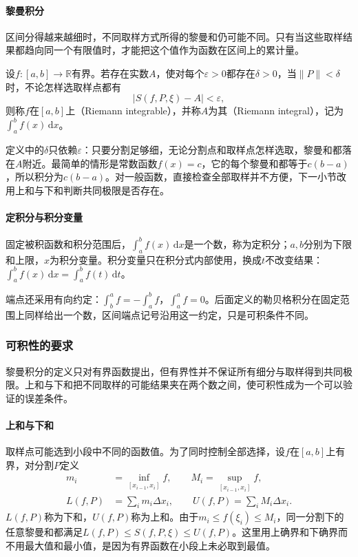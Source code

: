 \paragraph{黎曼积分}
区间分得越来越细时，不同取样方式所得的黎曼和仍可能不同。只有当这些取样结果都趋向同一个有限值时，才能把这个值作为函数在区间上的累计量。

\begin{definition}[黎曼积分]
\label{def:analysis-riemann-integral}
设$f:[a,b]\to\mathbb R$有界。若存在实数$A$，使对每个$\varepsilon>0$都存在$\delta>0$，当$\lVert P\rVert<\delta$时，不论怎样选取样点都有
\[
 |S(f,P,\xi)-A|<\varepsilon,
\]
则称$f$在$[a,b]$上（Riemann integrable），并称$A$为其（Riemann integral），记为$\int_a^bf(x)\,\mathrm dx$。
\end{definition}
定义中的$\delta$只依赖$\varepsilon$：只要分割足够细，无论分割点和取样点怎样选取，黎曼和都落在$A$附近。最简单的情形是常数函数$f(x)=c$，它的每个黎曼和都等于$c(b-a)$，所以积分为$c(b-a)$。对一般函数，直接检查全部取样并不方便，下一小节改用上和与下和判断共同极限是否存在。

\paragraph{定积分与积分变量}
固定被积函数和积分范围后，$\int_a^bf(x)\,\mathrm dx$是一个数，称为定积分；$a,b$分别为下限和上限，$x$为积分变量。积分变量只在积分式内部使用，换成$t$不改变结果：$\int_a^bf(x)\,\mathrm dx=\int_a^bf(t)\,\mathrm dt$。

端点还采用有向约定：$\int_b^af=-\int_a^bf$，$\int_a^af=0$。后面定义的勒贝格积分在固定范围上同样给出一个数，区间端点记号沿用这一约定，只是可积条件不同。

\subsubsection{可积性的要求}
\label{sec:analysis-integrability-requirements}

黎曼积分的定义只对有界函数提出，但有界性并不保证所有细分与取样得到共同极限。上和与下和把不同取样的可能结果夹在两个数之间，使可积性成为一个可以验证的误差条件。

\paragraph{上和与下和}
取样点可能选到小段中不同的函数值。为了同时控制全部选择，设$f$在$[a,b]$上有界，对分割$P$定义
\begin{equation}
 \begin{aligned}
 m_i&=\inf_{[x_{i-1},x_i]}f,\qquad M_i=\sup_{[x_{i-1},x_i]}f,\\
 L(f,P)&=\sum_i m_i\Delta x_i,\qquad
 U(f,P)=\sum_i M_i\Delta x_i.
 \end{aligned}
\label{eq:analysis-riemann-upper-lower-sums}
\end{equation}
$L(f,P)$称为下和，$U(f,P)$称为上和。由于$m_i\leq f(\xi_i)\leq M_i$，同一分割下的任意黎曼和都满足$L(f,P)\leq S(f,P,\xi)\leq U(f,P)$。这里用上确界和下确界而不用最大值和最小值，是因为有界函数在小段上未必取到最值。

